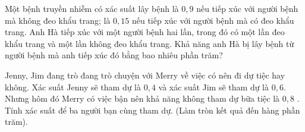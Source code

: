 \begin{ex}%
	Một bệnh truyền nhiễm có xác suất lây bệnh là $0{,}9$ nếu tiếp xúc với người bệnh mà không đeo khẩu trang; là $0{,}15$ nếu tiếp xúc với người bệnh mà có đeo khẩu trang. Anh Hà tiếp xúc với một người bệnh hai lần, trong đó có một lần đeo khẩu trang và một lần không đeo khẩu trang. Khả năng anh Hà bị lây bệnh từ người bệnh mà anh tiếp  xúc đó bằng bao nhiêu phần trăm?
\end{ex}

\begin{ex}%
	Jenny, Jim đang trò đang trò chuyện với  Merry về việc có nên đi dự tiệc hay không. Xác suất Jenny sẽ tham dự là $0{,}4$ và xác suất Jim sẽ tham dự là $0{,}6$. Nhưng hôm đó Merry có việc bận nên khả năng không tham dự bữa tiệc là $0{,}8$ . Tính xác suất để ba người bạn cùng tham dự. (Làm tròn kết quả đến hàng phần trăm).
\end{ex}

